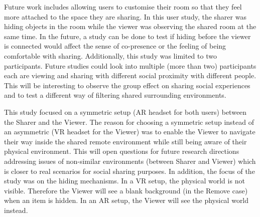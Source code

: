 Future work includes allowing users to customise their room so that they feel more attached to the space they are sharing. In this user study, the sharer was hiding objects in the room while the viewer was observing the shared room at the same time. In the future, a study can be done to test if hiding before the viewer is connected would affect the sense of co-presence or the feeling of being comfortable with sharing. Additionally, this study was limited to two participants. Future studies could look into multiple (more than two) participants each are viewing and sharing with different social proximity with different people. This will be interesting to observe the group effect on sharing social experiences and to test a different way of filtering shared surrounding environments. 



This study focused on a symmetric setup (AR headset for both users) between the Sharer and the Viewer. The reason for choosing a symmetric setup instead of an asymmetric (VR headset for the Viewer) was to enable the Viewer to navigate their way inside the shared remote environment while still being aware of their physical environment. This will open questions for future research directions addressing issues of non-similar environments (between Sharer and Viewer) which is closer to real scenarios for social sharing purposes. In addition, the focus of the study was on the hiding mechanisms. In a VR setup, the physical world is not visible. Therefore the Viewer will see a blank background (in the Remove case) when an item is hidden. In an AR setup, the Viewer will see the physical world instead.

